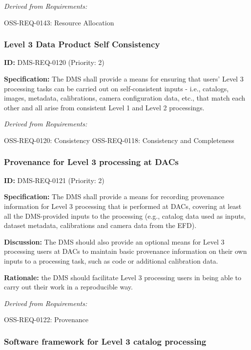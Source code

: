 \documentclass[SE,toc,lsstdraft]{lsstdoc}
\begin{document}
\emph{Derived from Requirements:}

OSS-REQ-0143:
Resource Allocation \newline

\subsubsection{Level 3 Data Product Self Consistency}

\label{DMS-REQ-0120}
\textbf{ID:} DMS-REQ-0120 (Priority: 2)

\textbf{Specification:} The DMS shall provide a means for ensuring that users' Level 3 processing tasks can be carried out on self-consistent inputs - i.e., catalogs, images, metadata, calibrations, camera configuration data, etc., that match each other and all arise from consistent Level 1 and Level 2 processings.

\emph{Derived from Requirements:}

OSS-REQ-0120:
Consistency \newline
OSS-REQ-0118:
Consistency and Completeness \newline

\subsubsection{Provenance for Level 3 processing at DACs}

\label{DMS-REQ-0121}
\textbf{ID:} DMS-REQ-0121 (Priority: 2)

\textbf{Specification:} The DMS shall provide a means for recording provenance information for Level 3 processing that is performed at DACs, covering at least all the DMS-provided inputs to the processing (e.g., catalog data used as inputs, dataset metadata, calibrations and camera data from the EFD).

\textbf{Discussion:} The DMS should also provide an optional means for Level 3 processing users at DACs to maintain basic provenance information on their own inputs to a processing task, such as code or additional calibration data.

\textbf{Rationale:} the DMS should facilitate Level 3 processing users in being able to carry out their work in a reproducible way.

\emph{Derived from Requirements:}

OSS-REQ-0122:
Provenance \newline

\subsubsection{Software framework for Level 3 catalog processing}
\end{document}
